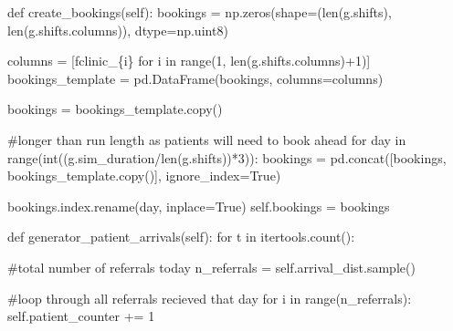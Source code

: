 \documentclass[
  letterpaper,
  DIV=11,
  numbers=noendperiod]{scrreprt}
\newenvironment{Shaded}{}{}
\newcommand{\BuiltInTok}[1]{\textcolor[rgb]{0.84,0.23,0.29}{#1}}
\newcommand{\CommentTok}[1]{\textcolor[rgb]{0.42,0.45,0.49}{#1}}
\newcommand{\ControlFlowTok}[1]{\textcolor[rgb]{0.84,0.23,0.29}{#1}}
\newcommand{\DecValTok}[1]{\textcolor[rgb]{0.00,0.36,0.77}{#1}}
\newcommand{\KeywordTok}[1]{\textcolor[rgb]{0.84,0.23,0.29}{#1}}
\newcommand{\NormalTok}[1]{\textcolor[rgb]{0.14,0.16,0.18}{#1}}
\newcommand{\OperatorTok}[1]{\textcolor[rgb]{0.14,0.16,0.18}{#1}}
\newcommand{\SpecialCharTok}[1]{\textcolor[rgb]{0.00,0.36,0.77}{#1}}
\newcommand{\SpecialStringTok}[1]{\textcolor[rgb]{0.01,0.18,0.38}{#1}}
\newcommand{\StringTok}[1]{\textcolor[rgb]{0.01,0.18,0.38}{#1}}
\newcommand{\VariableTok}[1]{\textcolor[rgb]{0.89,0.38,0.04}{#1}}
\begin{document}
\begin{tcolorbox}
\begin{Shaded}
\begin{Highlighting}[]
    \KeywordTok{def}\NormalTok{ create\_bookings(}\VariableTok{self}\NormalTok{):}
\NormalTok{        bookings }\OperatorTok{=}\NormalTok{ np.zeros(shape}\OperatorTok{=}\NormalTok{(}\BuiltInTok{len}\NormalTok{(g.shifts), }\BuiltInTok{len}\NormalTok{(g.shifts.columns)), dtype}\OperatorTok{=}\NormalTok{np.uint8)}

\NormalTok{        columns }\OperatorTok{=}\NormalTok{ [}\SpecialStringTok{f\textquotesingle{}clinic\_}\SpecialCharTok{\{}\NormalTok{i}\SpecialCharTok{\}}\SpecialStringTok{\textquotesingle{}} \ControlFlowTok{for}\NormalTok{ i }\KeywordTok{in} \BuiltInTok{range}\NormalTok{(}\DecValTok{1}\NormalTok{, }\BuiltInTok{len}\NormalTok{(g.shifts.columns)}\OperatorTok{+}\DecValTok{1}\NormalTok{)]}
\NormalTok{        bookings\_template }\OperatorTok{=}\NormalTok{ pd.DataFrame(bookings, columns}\OperatorTok{=}\NormalTok{columns)}

\NormalTok{        bookings }\OperatorTok{=}\NormalTok{ bookings\_template.copy()}

        \CommentTok{\#longer than run length as patients will need to book ahead}
        \ControlFlowTok{for}\NormalTok{ day }\KeywordTok{in} \BuiltInTok{range}\NormalTok{(}\BuiltInTok{int}\NormalTok{((g.sim\_duration}\OperatorTok{/}\BuiltInTok{len}\NormalTok{(g.shifts))}\OperatorTok{*}\DecValTok{3}\NormalTok{)):}
\NormalTok{            bookings }\OperatorTok{=}\NormalTok{ pd.concat([bookings, bookings\_template.copy()],}
\NormalTok{                                 ignore\_index}\OperatorTok{=}\VariableTok{True}\NormalTok{)}

\NormalTok{        bookings.index.rename(}\StringTok{\textquotesingle{}day\textquotesingle{}}\NormalTok{, inplace}\OperatorTok{=}\VariableTok{True}\NormalTok{)}
        \VariableTok{self}\NormalTok{.bookings }\OperatorTok{=}\NormalTok{ bookings}

    \KeywordTok{def}\NormalTok{ generator\_patient\_arrivals(}\VariableTok{self}\NormalTok{):}
        \ControlFlowTok{for}\NormalTok{ t }\KeywordTok{in}\NormalTok{ itertools.count():}

            \CommentTok{\#total number of referrals today}
\NormalTok{            n\_referrals }\OperatorTok{=} \VariableTok{self}\NormalTok{.arrival\_dist.sample()}

            \CommentTok{\#loop through all referrals recieved that day}
            \ControlFlowTok{for}\NormalTok{ i }\KeywordTok{in} \BuiltInTok{range}\NormalTok{(n\_referrals):}
                \VariableTok{self}\NormalTok{.patient\_counter }\OperatorTok{+=} \DecValTok{1}


\end{Highlighting}
\end{Shaded}
\end{tcolorbox}
\end{document}
